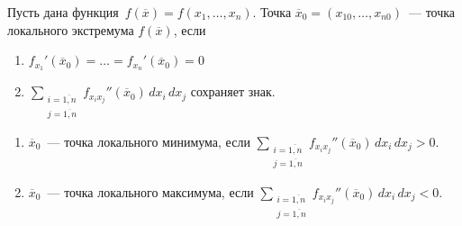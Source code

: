 \begin{theorem}
\label{th:sufficient_condition_of_local_extremum}
Пусть дана функция~$f(\overline x) = f(x_1, \ldots, x_n)$.
Точка $\overline x_0 = (x_{10}, \ldots, x_{n0})$~--- точка локального экстремума $f(\overline x)$, если
\begin{enumerate}
	\item $\displaystyle f_{x_1}'(\overline x_0) = \ldots = f_{x_n}'(\overline x_0) = 0$
	\item $\displaystyle \sum_{
	\begin{smallmatrix}
	i = \overline{1, n} \\
	j = \overline{1, n}
	\end{smallmatrix}
	} f_{x_i x_j}''(\overline x_0)\,dx_i\,dx_j$ сохраняет знак.
\end{enumerate}

\begin{enumerate}
	\item $\overline x_0$~--- точка локального минимума, если $\displaystyle \sum_{
	\begin{smallmatrix}
	i = \overline{1, n} \\
	j = \overline{1, n}
	\end{smallmatrix}
	} f_{x_i x_j}''(\overline x_0)\,dx_i\,dx_j > 0$.
	\item $\overline x_0$~--- точка локального максимума, если $\displaystyle \sum_{
	\begin{smallmatrix}
	i = \overline{1, n} \\
	j = \overline{1, n}
	\end{smallmatrix}
	} f_{x_i x_j}''(\overline x_0)\,dx_i\,dx_j < 0$.
\end{enumerate}
\end{theorem}
